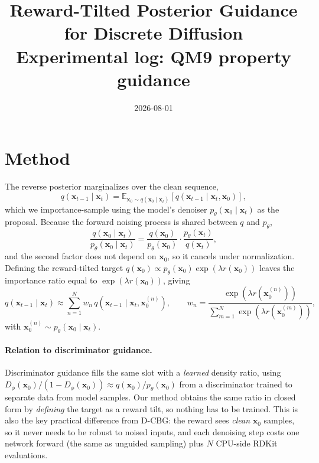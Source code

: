 \documentclass[11pt]{article}
\title{Reward-Tilted Posterior Guidance for Discrete Diffusion\\
\large Experimental log: QM9 property guidance}
\author{}
\date{2026-08-01}
\begin{document}
\maketitle

\section{Method}
\label{sec:method}

The reverse posterior marginalizes over the clean sequence,
\begin{equation}
q(\mathbf{x}_{t-1} \mid \mathbf{x}_t)
  = \mathbb{E}_{\mathbf{x}_0 \sim q(\mathbf{x}_0 \mid \mathbf{x}_t)}
    \left[ q(\mathbf{x}_{t-1} \mid \mathbf{x}_t, \mathbf{x}_0) \right],
\end{equation}
which we importance-sample using the model's denoiser
$p_\theta(\mathbf{x}_0 \mid \mathbf{x}_t)$ as the proposal. Because the forward
noising process is shared between $q$ and $p_\theta$,
\begin{equation}
\frac{q(\mathbf{x}_0 \mid \mathbf{x}_t)}{p_\theta(\mathbf{x}_0 \mid \mathbf{x}_t)}
  = \frac{q(\mathbf{x}_0)}{p_\theta(\mathbf{x}_0)}
    \cdot \frac{p_\theta(\mathbf{x}_t)}{q(\mathbf{x}_t)},
\end{equation}
and the second factor does not depend on $\mathbf{x}_0$, so it cancels under
normalization. Defining the reward-tilted target
$q(\mathbf{x}_0) \propto p_\theta(\mathbf{x}_0)\exp(\lambda r(\mathbf{x}_0))$
leaves the importance ratio equal to $\exp(\lambda r(\mathbf{x}_0))$, giving
\begin{equation}
q(\mathbf{x}_{t-1} \mid \mathbf{x}_t)
  \approx \sum_{n=1}^{N} w_n \, q(\mathbf{x}_{t-1} \mid \mathbf{x}_t, \mathbf{x}_0^{(n)}),
  \qquad
  w_n = \frac{\exp(\lambda r(\mathbf{x}_0^{(n)}))}
             {\sum_{m=1}^{N}\exp(\lambda r(\mathbf{x}_0^{(m)}))},
\label{eq:mixture}
\end{equation}
with $\mathbf{x}_0^{(n)} \sim p_\theta(\mathbf{x}_0 \mid \mathbf{x}_t)$.

\paragraph{Relation to discriminator guidance.}
Discriminator guidance fills the same slot with a \emph{learned} density ratio,
using $D_\phi(\mathbf{x}_0)/(1 - D_\phi(\mathbf{x}_0)) \approx
q(\mathbf{x}_0)/p_\theta(\mathbf{x}_0)$ from a discriminator trained to separate
data from model samples. Our method obtains the same ratio in closed form by
\emph{defining} the target as a reward tilt, so nothing has to be trained. This
is also the key practical difference from D-CBG: the reward sees \emph{clean}
$\mathbf{x}_0$ samples, so it never needs to be robust to noised inputs, and
each denoising step costs one network forward (the same as unguided sampling)
plus $N$ CPU-side RDKit evaluations.
\end{document}
